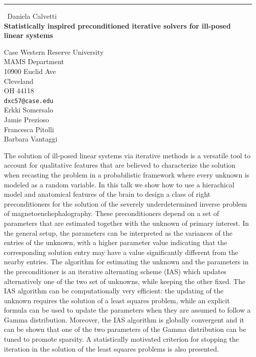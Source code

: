 \documentclass{report}
\begin{document}
\begin{center}
\rule{6in}{1pt} \
{\large Daniela Calvetti \\
{\bf Statistically inspired preconditioned iterative solvers for ill-posed linear systems}}

Case Western Reserve University \\ MAMS Department \\ 10900 Euclid Ave \\ Cleveland \\ OH 44118
\\
{\tt dxc57@case.edu}\\
Erkki Somersalo\\
Jamie Prezioso\\
Francesca Pitolli\\
Barbara Vantaggi\end{center}

The solution of ill-posed linear systems via iterative methods is a
versatile tool to account for qualitative features that are believed to
characterize the solution when recasting the problem in a probabilistic
framework where every unknown is modeled as a random variable. In this
talk we show how to use a hierachical model and anatomical features of
the brain to design a class of right preconditioners for the solution of
the severely underdetermined inverse problem of magnetoenchephalography.
These preconditioners depend on a set of parameters that are estimated
together with the unknown of primary interest. In the general setup, the
parameters can be interpreted as the variances of the entries of the
unknown, with a higher parameter value indicating that the corresponding
solution entry may have a value significantly different from the nearby
entries.
The algorithm for estimating the unknown and the parameters in the
preconditioner is an iterative alternating scheme (IAS) which updates
alternatively one of the two set of unknowns, while keeping the other
fixed. The IAS algorithm can be computationally very efficient: the
updating of the unknown requires the solution of a least squares problem,
while an explicit formula can be used to update the parameters when they
are assumed to follow a Gamma distribution. Moreover, the IAS algorithm
is globally convergent and it can be shown that one of the two parameters
of the Gamma distribution can be tuned to promote sparsity. A
statistically motivated criterion for stopping the iteration in the
solution of the least squares problems is also presented.
\end{document}
